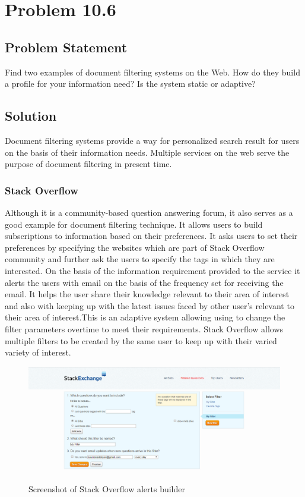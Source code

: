 \documentclass[12pt]{report}
\begin{document}
\chapter{Problem 10.6}
\section{Problem Statement}
Find two examples of document filtering systems on the Web. How do they build a profile for your information need? Is the system static or adaptive?
\section{Solution}
Document filtering systems provide a way for personalized search result for users on the basis of their information needs. Multiple services on the web serve the purpose of document filtering in present time.
\subsection{Stack Overflow}
Although it is a community-based question answering forum, it also serves as a good example for document filtering technique. It allows users to build subscriptions to information based on their preferences. It asks users to set their preferences by specifying the websites which are part of Stack Overflow community and further ask the users to specify the tags in which they are interested. On the basis of the information requirement provided to the service it alerts the users with email on the basis of the frequency set for receiving the email. It helps the user share their knowledge relevant to their area of interest and also with keeping up with the latest issues faced by other user's relevant to their area of interest.This is an adaptive system allowing using to change the filter parameters overtime to meet their requirements. Stack Overflow allows multiple filters to be created  by the same user to keep up with their varied variety of interest.  

\begin{figure}[ht]
  \centering
  \includegraphics[width=1\textwidth]{Problem10_6/Stackoverflow.png}
  \caption{Screenshot of Stack Overflow alerts builder}
  \label{fig:1}
\end{figure} 
\end{document}
